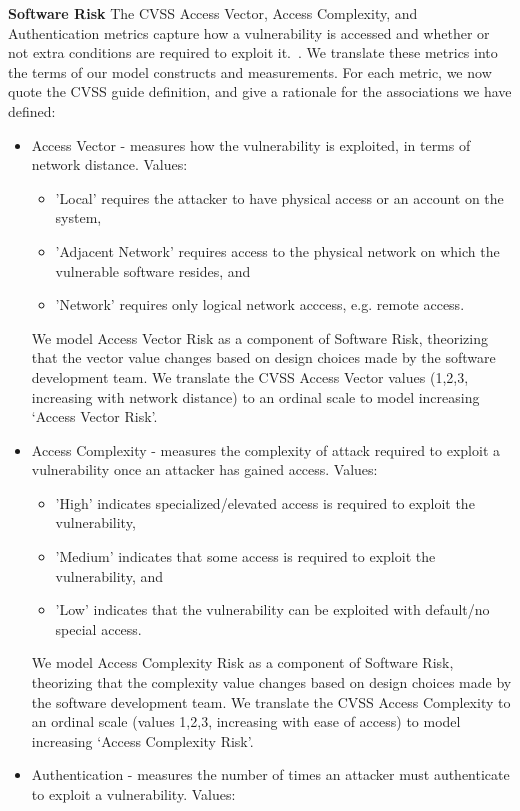 \textbf{Software Risk}
\label{sec:evaluation_nvd_selection_risk}
The CVSS Access Vector, Access Complexity, and Authentication metrics capture how a vulnerability is accessed and whether or not extra conditions are required to exploit it.~\cite{mell2007complete}. We translate these metrics into the terms of our model constructs and measurements. For each metric, we now quote the CVSS guide definition, and give a rationale for the associations we have defined:
\begin{itemize}
	\item Access Vector - measures how the vulnerability is exploited, in terms of network distance. Values:
	\begin{itemize}
		\item 'Local' requires the attacker to have physical access or an account on the system, \item 'Adjacent Network' requires access to the physical network on which the vulnerable software resides, and \item 'Network' requires only logical network acccess, e.g. remote access. 
	\end{itemize}
	We model Access Vector Risk as a component of Software Risk, theorizing that the vector value changes based on design choices made by the software development team. We translate the CVSS Access Vector values (1,2,3, increasing with network distance) to an ordinal scale to model increasing `Access Vector Risk'.
	\item Access Complexity - measures the complexity of attack required to exploit a vulnerability once an attacker has gained access. Values: 
	\begin{itemize}
		\item 'High' indicates specialized/elevated access is required to exploit the vulnerability, 
		\item 'Medium' indicates that some access is required to exploit the vulnerability, and \item 'Low' indicates that the vulnerability can be exploited with default/no special access.  
	\end{itemize}
	We model Access Complexity Risk as a component of Software Risk, theorizing that the complexity value changes based on design choices made by the software development team. We translate the CVSS Access Complexity  to an ordinal scale (values 1,2,3, increasing with ease of access) to model increasing `Access Complexity Risk'.
	\item Authentication - measures the number of times an attacker must authenticate to exploit a vulnerability. Values: 

\end{itemize}
